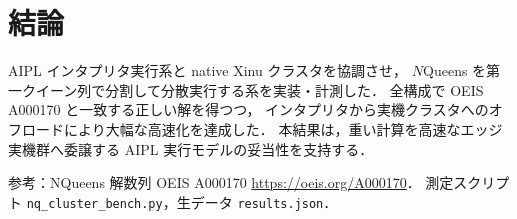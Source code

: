 \documentclass[11pt,a4paper]{article}
\begin{document}
\section{結論}
AIPL インタプリタ実行系と native Xinu クラスタを協調させ，
$N$\textendash Queens を第一クイーン列で分割して分散実行する系を実装・計測した．
全構成で OEIS A000170 と一致する正しい解を得つつ，
インタプリタから実機クラスタへのオフロードにより大幅な高速化を達成した．
本結果は，重い計算を高速なエッジ実機群へ委譲する AIPL 実行モデルの妥当性を支持する．

\vspace{4pt}\noindent\footnotesize
参考：N\textendash Queens 解数列 OEIS A000170 \url{https://oeis.org/A000170}．
測定スクリプト \texttt{nq\_cluster\_bench.py}，生データ \texttt{results.json}．
\end{document}
